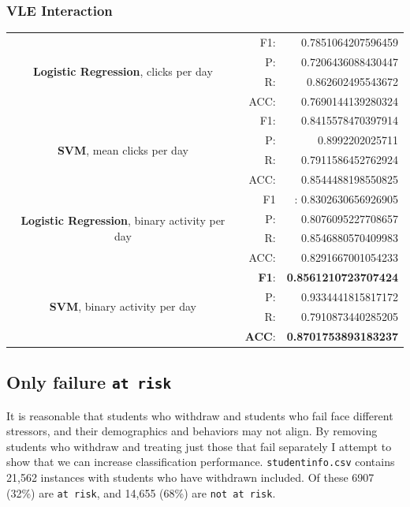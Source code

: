 \documentclass{article}
\begin{document}
\subsubsection{VLE Interaction}
\begin{center}
\begin{tabular}{|c|rr|}
\hline
\multirow{4}{10cm}{\textbf{Logistic Regression}, clicks per day}
&F1:&  0.7851064207596459\\
&P:&   0.7206436088430447\\
&R:&   0.862602495543672\\
&ACC:& 0.7690144139280324\\
\hline
\multirow{4}{10cm}{\textbf{SVM}, mean clicks per day}
&F1:&  0.8415578470397914 \\
&P:&   0.8992202025711 \\
&R:&   0.7911586452762924 \\
&ACC:& 0.8544488198550825 \\
\hline
\multirow{4}{10cm}{\textbf{Logistic Regression}, binary activity per day}
&F1&:  0.8302630656926905\\
&P:&   0.8076095227708657\\
&R:&   0.8546880570409983\\
&ACC:& 0.8291667001054233\\
\hline
\multirow{4}{10cm}{\textbf{SVM}, binary activity per day}
&\textbf{F1}:&  \textbf{0.8561210723707424} \\
&P:&   0.9334441815817172 \\
&R:&   0.7910873440285205 \\
&\textbf{ACC}:& \textbf{0.8701753893183237} \\
\hline
\end{tabular}
\end{center}
\subsection{Only failure \texttt{at risk}}
It is reasonable that students who withdraw and students who fail face different stressors, and their demographics and behaviors may not align. By removing students who withdraw and treating just those that fail separately I attempt to show that we can increase classification performance. \texttt{studentinfo.csv} contains 21,562 instances with students who have withdrawn included. Of these 6907 (32\%) are \texttt{at risk}, and 14,655 (68\%) are \texttt{not at risk}.
\end{document}

